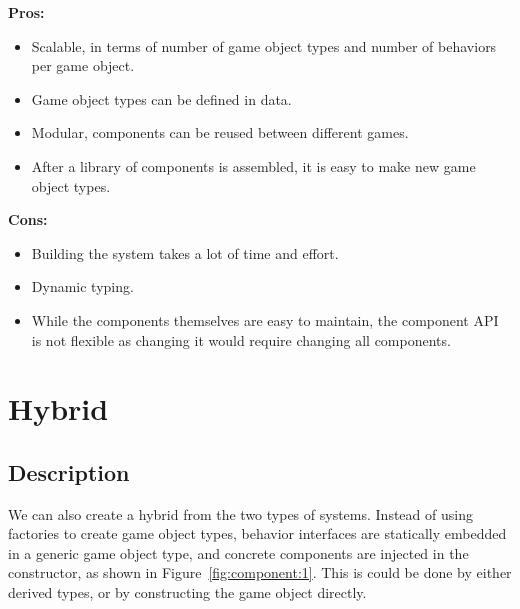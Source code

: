 \documentclass[
    phd,
    electronic,
    letterpaper,
    simplechapterheading,
    openany,
    parttop,
    lof,
]{byumsphd}
\begin{document}
\begin{minipage}[t]{0.45\textwidth}
\textbf{Pros:}
\begin{itemize}
    \item Scalable, in terms of number of game object types and number of behaviors per game object.
    \item Game object types can be defined in data.
    \item Modular, components can be reused between different games.
    \item After a library of components is assembled, it is easy to make new game object types.
\end{itemize}\end{minipage}
\hfill \vrule \hfill
\begin{minipage}[t]{0.45\textwidth}
\textbf{Cons:}
\begin{itemize}
    \item Building the system takes a lot of time and effort.
    \item Dynamic typing.
    \item While the components themselves are easy to maintain, the component API is not flexible as changing it would require changing all components.
\end{itemize}\end{minipage}


\pagebreak

\section{Hybrid}

\subsection{Description}

We can also create a hybrid from the two types of systems. Instead of using factories to create game object types, behavior interfaces are statically embedded in a generic game object type, and concrete components are injected in the constructor, as shown in Figure~\ref{fig:component:1}. This is could be done by either derived types, or by constructing the game object directly.
\end{document}
